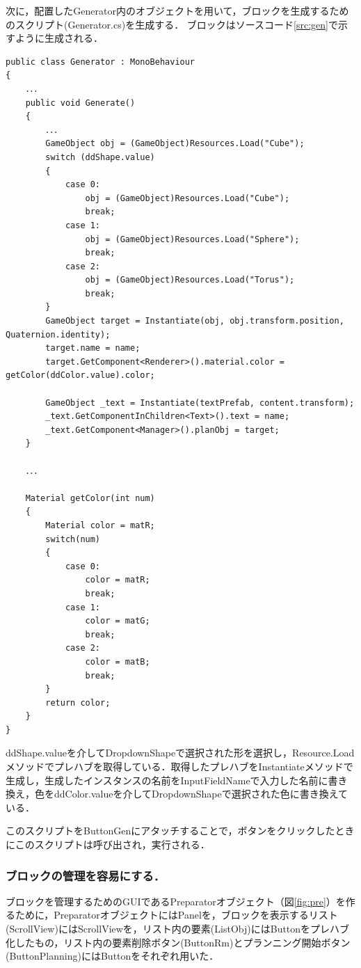 \documentclass[12pt]{jarticle}
\begin{document}
\clearpage

次に，配置したGenerator内のオブジェクトを用いて，ブロックを生成するためのスクリプト(Generator.cs)を生成する．
ブロックはソースコード\ref{src:gen}で示すように生成される．

\begin{lstlisting}[caption=Generatorクラス, label=src:gen]
public class Generator : MonoBehaviour
{
    ．．．
    public void Generate()
    {
        ．．．
        GameObject obj = (GameObject)Resources.Load("Cube");
        switch (ddShape.value)
        {
            case 0:
                obj = (GameObject)Resources.Load("Cube");
                break;
            case 1:
                obj = (GameObject)Resources.Load("Sphere");
                break;
            case 2:
                obj = (GameObject)Resources.Load("Torus");
                break;
        }
        GameObject target = Instantiate(obj, obj.transform.position, Quaternion.identity);
        target.name = name;
        target.GetComponent<Renderer>().material.color = getColor(ddColor.value).color;

        GameObject _text = Instantiate(textPrefab, content.transform);
        _text.GetComponentInChildren<Text>().text = name;
        _text.GetComponent<Manager>().planObj = target;
    }
    
    ．．．

    Material getColor(int num)
    {
        Material color = matR;
        switch(num)
        {
            case 0:
                color = matR;
                break;
            case 1:
                color = matG;
                break;
            case 2:
                color = matB;
                break;
        }
        return color;
    }
}
\end{lstlisting}

ddShape.valueを介してDropdownShapeで選択された形を選択し，Resource.Loadメソッドでプレハブを取得している．取得したプレハブをInstantiateメソッドで生成し，生成したインスタンスの名前をInputFieldNameで入力した名前に書き換え，色をddColor.valueを介してDropdownShapeで選択された色に書き換えている．

このスクリプトをButtonGenにアタッチすることで，ボタンをクリックしたときにこのスクリプトは呼び出され，実行される．
\clearpage

\subsubsection{ブロックの管理を容易にする．}
ブロックを管理するためのGUIであるPreparatorオブジェクト（図\ref{fig:pre}）を作るために，PreparatorオブジェクトにはPanelを，ブロックを表示するリスト(ScrollView)にはScrollViewを，リスト内の要素(ListObj)にはButtonをプレハブ化したもの，リスト内の要素削除ボタン(ButtonRm)とプランニング開始ボタン(ButtonPlanning)にはButtonをそれぞれ用いた．
\end{document}
